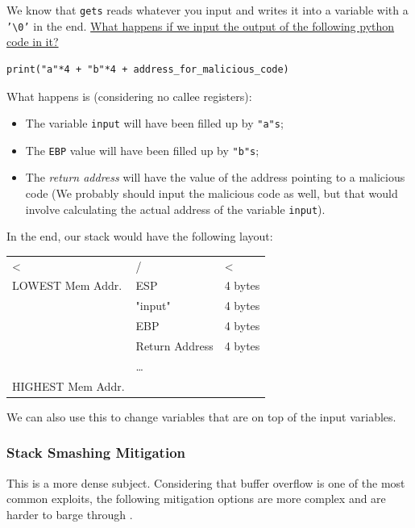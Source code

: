 \documentclass[11pt]{article}
\begin{document}
We know that \texttt{gets} reads whatever you input and writes it into a variable with a \texttt{'\textbackslash{}0'} in the end. \uline{What happens if we input the output of the following python code in it?}

\begin{verbatim}
print("a"*4 + "b"*4 + address_for_malicious_code)
\end{verbatim}

What happens is (considering no callee registers):
\begin{itemize}
\item The variable \texttt{input} will have been filled up by \texttt{"a"s};
\item The \texttt{EBP} value will have been filled up by \texttt{"b"s};
\item The \emph{return address} will have the value of the address pointing to a malicious code (We probably should input the malicious code as well, but that would involve calculating the actual address of the variable \texttt{input}).
\end{itemize}

In the end, our stack would have the following layout:

\begin{center}
\begin{tabular}{lll}
\hline
< & / & <\\
LOWEST Mem Addr. & ESP & 4 bytes\\
\hline
 & "input" & 4 bytes\\
\hline
 & EBP & 4 bytes\\
\hline
 & Return Address & 4 bytes\\
\hline
 & \ldots{} & \\
\hline
HIGHEST Mem Addr. &  & \\
\hline
\end{tabular}
\end{center}

We can also use this to change variables that are on top of the input variables.

\subsubsection{Stack Smashing Mitigation}
\label{sec:org167ed7f}
This is a more dense subject. Considering that buffer overflow is one of the most common exploits, the following mitigation options are more complex and are harder to barge through \cite{MemoryDefenseSlide}.
\end{document}
